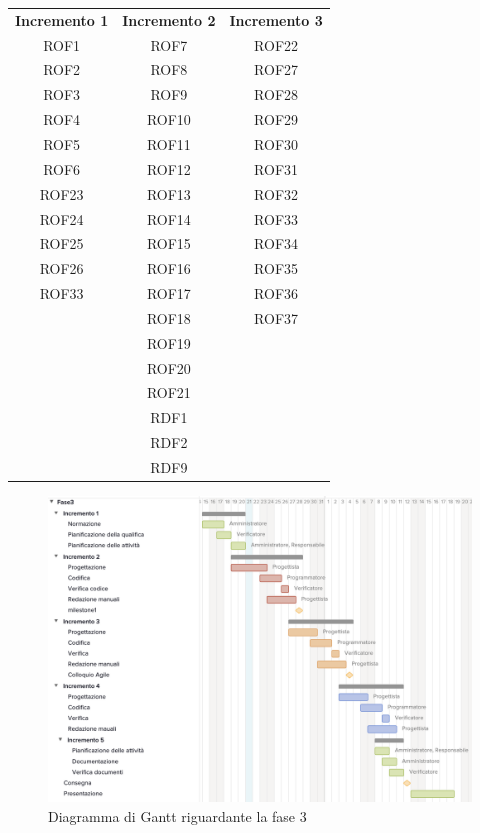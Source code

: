 \begin{tabularx}{\textwidth}{| c | c | c | }
		\rowcolor{LightBlue}
		\color{white}\bfseries Incremento 1 & 
		\color{white}\bfseries Incremento 2 & 
		\color{white}\bfseries Incremento 3 \\[0.25cm]
		ROF1 & ROF7 & ROF22 \\ 
		ROF2 & ROF8 & ROF27 \\ 
		ROF3 & ROF9 & ROF28 \\ 
		ROF4 & ROF10 & ROF29 \\ 
		ROF5 & ROF11 & ROF30 \\ 
		ROF6 & ROF12 & ROF31 \\ 
		ROF23 & ROF13 & ROF32 \\ 
		ROF24 & ROF14 & ROF33 \\ 
		ROF25 & ROF15 & ROF34 \\ 
		ROF26 & ROF16 & ROF35 \\ 
		ROF33 & ROF17 & ROF36 \\ 
		& ROF18 & ROF37 \\ 
		& ROF19 & \\ 
		& ROF20 & \\ 
		& ROF21 & \\ 
		& RDF1 & \\ 
		& RDF2 & \\ 
		& RDF9 & \\ \hline
	\end{tabularx}

\begin{figure}[h]
	\centering
	\includegraphics[scale=0.70]{images/fase3.png}
	\caption{Diagramma di Gantt riguardante la fase 3}
\end{figure}